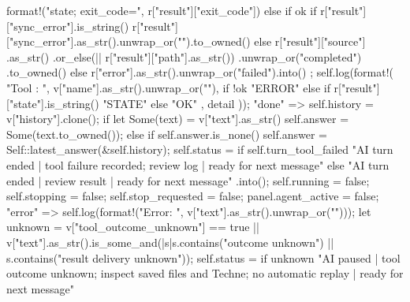{{{{{{{{                                format!("{state}; exit_code={}", r["result"]["exit_code"])
                            } else if ok {
                                if r["result"]["sync_error"].is_string() {
                                    r["result"]["sync_error"].as_str().unwrap_or("").to_owned()
                                } else {
                                    r["result"]["source"]
                                        .as_str()
                                        .or_else(|| r["result"]["path"].as_str())
                                        .unwrap_or("completed")
                                        .to_owned()
                                }
                            } else {
                                r["error"].as_str().unwrap_or("failed").into()
                            };
                            self.log(format!(
                                "Tool {}: {} {}",
                                v["name"].as_str().unwrap_or(""),
                                if !ok { "ERROR" } else if r["result"]["state"].is_string() { "STATE" } else { "OK" },
                                detail
                            ));
                        }
                        "done" => {
                            self.history = v["history"].clone();
                            if let Some(text) = v["text"].as_str() { self.answer = Some(text.to_owned()); }
                            else if self.answer.is_none() { self.answer = Self::latest_answer(&self.history); }
                            self.status = if self.turn_tool_failed {
                                "AI turn ended | tool failure recorded; review log | ready for next message"
                            } else {
                                "AI turn ended | review result | ready for next message"
                            }.into();
                            self.running = false;
                            self.stopping = false;
                            self.stop_requested = false;
                            panel.agent_active = false;
                        }
                        "error" => {
                            self.log(format!("Error: {}", v["text"].as_str().unwrap_or("")));
                            let unknown = v["tool_outcome_unknown"] == true
                                || v["text"].as_str().is_some_and(|s|s.contains("outcome unknown") || s.contains("result delivery unknown"));
                            self.status = if unknown {
                                "AI paused | tool outcome unknown; inspect saved files and Techne; no automatic replay | ready for next message"
}}}}}}}}
